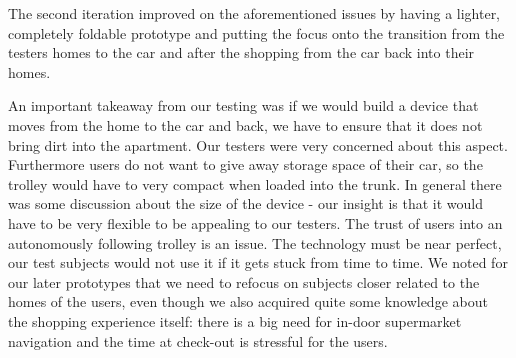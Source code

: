 The second iteration improved on the aforementioned issues by having a lighter, completely foldable prototype and putting the focus onto the transition from the testers homes to the car and after the shopping from the car back into their homes. 

An important takeaway from our testing was if we would build a device that moves from the home to the car and back, we have to ensure that it does not bring dirt into the apartment. Our testers were very concerned about this aspect. 
Furthermore users do not want to give away storage space of their car, so the trolley would have to very compact when loaded into the trunk. In general there was some discussion about the size of the device - our insight is that it would have to be very flexible to be appealing to our testers.
The trust of users into an autonomously following trolley is an issue. The technology must be near perfect, our test subjects would not use it if it gets stuck from time to time.
We noted for our later prototypes that we need to refocus on subjects closer related to the homes of the users, even though we also acquired quite some knowledge about the shopping experience itself: there is a big need for in-door supermarket navigation and the time at check-out is stressful for the users.
